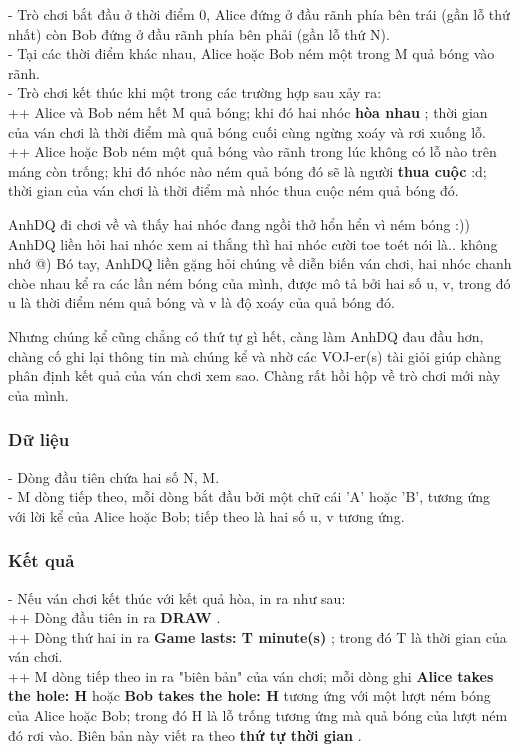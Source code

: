    - Trò chơi bắt đầu ở thời điểm 0, Alice đứng ở đầu rãnh phía bên trái (gần lỗ thứ nhất) còn Bob đứng ở đầu rãnh phía bên phải (gần lỗ thứ N).   
\\   - Tại các thời điểm khác nhau, Alice hoặc Bob ném một trong M quả bóng vào rãnh.   
\\   - Trò chơi kết thúc khi một trong các trường hợp sau xảy ra:   
\\   ++ Alice và Bob ném hết M quả bóng; khi đó hai nhóc   \textbf{    hòa nhau   }   ; thời gian của ván chơi là thời điểm mà quả bóng cuối cùng ngừng xoáy và rơi xuống lỗ.   
\\   ++ Alice hoặc Bob ném một quả bóng vào rãnh trong lúc không có lỗ nào trên máng còn trống; khi đó nhóc nào ném quả bóng đó sẽ là người   \textbf{    thua cuộc   }   :d; thời gian của ván chơi là thời điểm mà nhóc thua cuộc ném quả bóng đó.  

   AnhDQ đi chơi về và thấy hai nhóc đang ngồi thở hổn hển vì ném bóng :)) AnhDQ liền hỏi hai nhóc xem ai thắng thì hai nhóc cười toe toét nói là.. không nhớ @) Bó tay, AnhDQ liền gặng hỏi chúng về diễn biến ván chơi, hai nhóc chanh chòe nhau kể ra các lần ném bóng của mình, được mô tả bởi hai số u, v, trong đó u là thời điểm ném quả bóng và v là độ xoáy của quả bóng đó.  

   Nhưng chúng kể cũng chẳng có thứ tự gì hết, càng làm AnhDQ đau đầu hơn, chàng cố ghi lại thông tin mà chúng kể và nhờ các VOJ-er(s) tài giỏi giúp chàng phân định kết quả của ván chơi xem sao. Chàng rất hồi hộp về trò chơi mới này của mình.  

\subsubsection{   Dữ liệu  }

   - Dòng đầu tiên chứa hai số N, M.   
\\   - M dòng tiếp theo, mỗi dòng bắt đầu bởi một chữ cái 'A' hoặc 'B', tương ứng với lời kể của Alice hoặc Bob; tiếp theo là hai số u, v tương ứng.  

\subsubsection{   Kết quả  }

   - Nếu ván chơi kết thúc với kết quả hòa, in ra như sau:   
\\   ++ Dòng đầu tiên in ra   \textbf{    DRAW   }   .   
\\   ++ Dòng thứ hai in ra   \textbf{    Game lasts: T minute(s)   }   ; trong đó T là thời gian của ván chơi.   
\\   ++ M dòng tiếp theo in ra "biên bản" của ván chơi; mỗi dòng ghi   \textbf{    Alice takes the hole: H   }   hoặc   \textbf{    Bob takes the hole: H   }   tương ứng với một lượt ném bóng của Alice hoặc Bob; trong đó H là lỗ trống tương ứng mà quả bóng của lượt ném đó rơi vào. Biên bản này viết ra theo   \textbf{    thứ tự thời gian   }   .  

